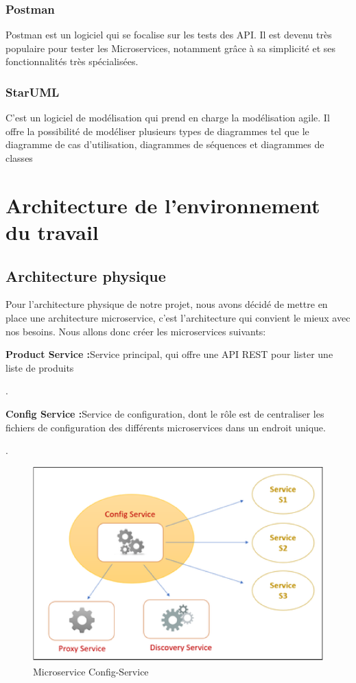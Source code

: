      \subsubsection{Postman}
Postman est un logiciel qui se focalise sur les tests des API. Il est devenu très populaire pour tester les Microservices, notamment grâce à sa simplicité et ses fonctionnalités très spécialisées.
\subsubsection{StarUML}
C’est un logiciel de modélisation qui prend en charge la modélisation agile. Il offre la
possibilité de modéliser plusieurs types de diagrammes tel que le diagramme de cas d’utilisation,
diagrammes de séquences et diagrammes de classes


\section{Architecture de l'environnement du travail}
    \subsection{Architecture physique}
    Pour l'architecture physique de notre projet, nous avons décidé de mettre en place une architecture microservice, c'est l'architecture qui convient le mieux avec nos besoins. 
Nous allons donc créer les microservices suivants:
\begin{itemize}[font=\normalsize]
                  \textbf{ Product Service :}Service principal, qui offre une API REST pour lister une
liste de produits
                  \end{itemize} .
                  
                  \begin{itemize}[font=\normalsize]
                  \textbf{ Config Service :}Service de configuration, dont le rôle est de centraliser les
fichiers de configuration des différents microservices dans un endroit
unique.
                  \end{itemize} .
                  \begin{figure}[H]
        \centering
        \includegraphics[width=1\columnwidth,height=0.5
\columnwidth]{images/config.PNG}
        \caption{Microservice Config-Service}
        \end{figure}
        \newpage
        
